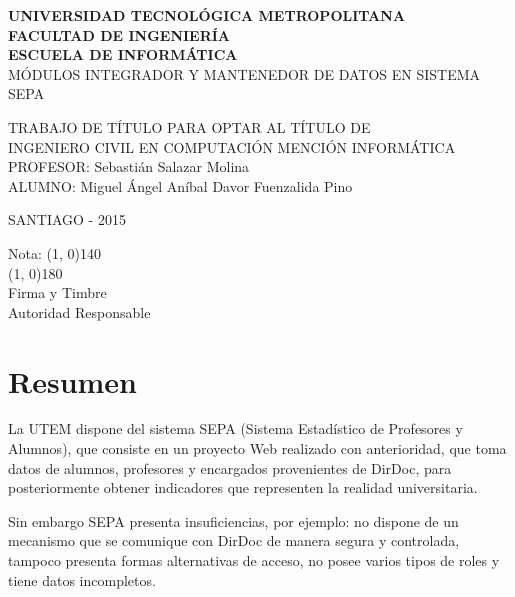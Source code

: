 \documentclass[a4paper,12pt,openany,oneside]{book}
\begin{document}

\begin{center}
\textbf{UNIVERSIDAD TECNOLÓGICA METROPOLITANA\\
FACULTAD DE INGENIERÍA\\
ESCUELA DE INFORMÁTICA}\\
\vspace{3cm}
MÓDULOS INTEGRADOR Y MANTENEDOR DE DATOS EN SISTEMA SEPA
\end{center}
\begin{flushright}
TRABAJO DE TÍTULO PARA OPTAR AL TÍTULO DE\\
INGENIERO CIVIL EN COMPUTACIÓN MENCIÓN INFORMÁTICA\\
\vspace{3cm}
PROFESOR: Sebastián Salazar Molina\\
\vspace{1.5cm}
ALUMNO: Miguel Ángel Aníbal Davor Fuenzalida Pino
\end{flushright}
\vspace{4cm}
\begin{center}
SANTIAGO - 2015
\end{center}
\newpage
\thispagestyle{empty}
\begin{flushright}
\vspace{20mm}
Nota: \line(1, 0){140} \\
\vspace{30 mm}
\line(1, 0){180}\\	
Firma y Timbre\\
Autoridad Responsable
\end{flushright}
\chapter*{Resumen}
\thispagestyle{empty}

La UTEM dispone del sistema SEPA (Sistema Estadístico de Profesores y Alumnos), que consiste en un proyecto Web realizado con anterioridad, que toma datos de alumnos, profesores y encargados provenientes de DirDoc, para posteriormente obtener indicadores que representen la realidad universitaria.

Sin embargo SEPA presenta insuficiencias, por ejemplo: no dispone de un mecanismo que se comunique con DirDoc de manera segura y controlada, tampoco presenta formas alternativas de acceso, no posee varios tipos de roles y tiene datos incompletos.
\end{document}
